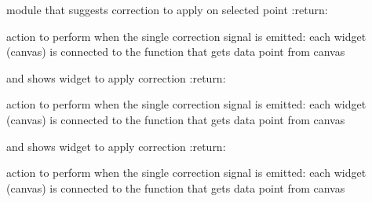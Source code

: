 \documentclass[letterpaper,10pt,english]{sphinxmanual}
\begin{document}
\begin{fulllineitems}
\begin{fulllineitems}
\begin{quote}
\begin{description}
\end{description}\end{quote}

\end{fulllineitems}


\begin{fulllineitems}
\label{Cormat_main:Cormat_main.CORMAT_GUI.suggestcorrection}
module that suggests correction to apply on selected point
:return:

\end{fulllineitems}


\begin{fulllineitems}
\label{Cormat_main:Cormat_main.CORMAT_GUI.getcorrectionpointwidget}
action to perform when the single correction signal is emitted:
each widget (canvas) is connected to the function that gets data point from canvas

and shows widget to apply correction
:return:

\end{fulllineitems}


\begin{fulllineitems}
\label{Cormat_main:Cormat_main.CORMAT_GUI.getmultiplecorrectionpointswidget}
action to perform when the single correction signal is emitted:
each widget (canvas) is connected to the function that gets data point from canvas

and shows widget to apply correction
:return:

\end{fulllineitems}


\begin{fulllineitems}
\label{Cormat_main:Cormat_main.CORMAT_GUI.disconnnet_multiplecorrectionpointswidget}
action to perform when the single correction signal is emitted:
each widget (canvas) is connected to the function that gets data point from canvas


\end{fulllineitems}
\end{fulllineitems}
\end{document}
